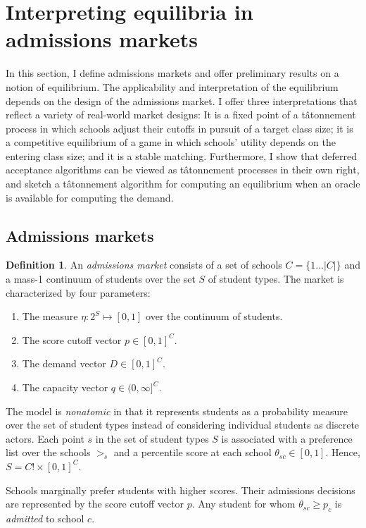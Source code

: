 \documentclass[12pt]{article}
\theoremstyle{definition}
\newtheorem{definition}{Definition}
\begin{document}
\section{Interpreting equilibria in admissions markets} \label{interpeqinadmmkts}
In this section, I define admissions markets and offer preliminary results on a notion of equilibrium. The applicability and interpretation of the equilibrium depends on the design of the admissions market. I offer three interpretations that reflect a variety of real-world market designs: It is a fixed point of a t\^{a}tonnement process in which schools adjust their cutoffs in pursuit of a target class size; it is a competitive equilibrium of a game in which schools' utility depends on the entering class size; and it is a stable matching. Furthermore, I show that deferred acceptance algorithms can be viewed as t\^{a}tonnement processes in their own right, and sketch a t\^{a}tonnement algorithm for computing an equilibrium when an oracle is available for computing the demand.

\subsection{Admissions markets}
\begin{definition} An \emph{admissions market} consists of a set of schools $C = \{ 1\dots |C| \}$ and a mass-1 continuum of students over the set $S$ of student types. The market is characterized by four parameters:
\begin{enumerate}
\item The measure $\eta: 2^S \mapsto [0, 1]$ over the continuum of students.
\item The score cutoff vector $p \in [0, 1]^C$. 
\item The demand vector $D \in [0, 1]^C$.
\item The capacity vector $q \in (0, \infty]^C$.
\end{enumerate}
\end{definition}

The model is \emph{nonatomic} in that it represents students as a probability measure over the set of student types instead of considering individual students as discrete actors. Each point $s$ in the set of student types $S$ is associated with a preference list over the schools $>_s$ and a percentile score at each school $\theta_{sc} \in [0,1]$. Hence, $S = C! \times [0, 1]^C$. 

Schools marginally prefer students with higher scores. Their admissions decisions are represented by the score cutoff vector $p$. Any student for whom $\theta_{sc} \geq p_c$ is \emph{admitted} to school $c$. 
\end{document}
